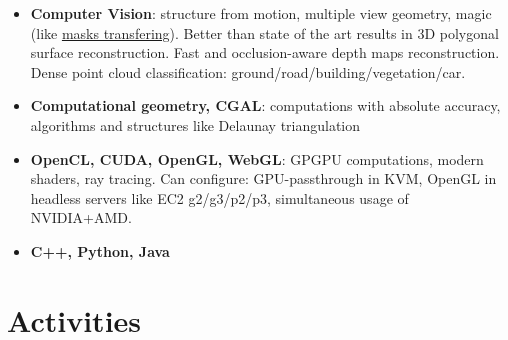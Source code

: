 \documentclass[11pt,oneside]{article}
\newcommand{\hhref}[2]{\href{#1}{\color{blue}#2}}
\begin{document}
\begin{itemize}
    \item{\textbf{Computer Vision}}: structure from motion, multiple view geometry, magic (like  \hhref{http://www.agisoft.com/index.php?id=49}{masks transfering}).
    Better than state of the art results in 3D polygonal surface reconstruction.
    Fast and occlusion-aware depth maps reconstruction.
    Dense point cloud classification: ground/road/building/vegetation/car.

    \item{\textbf{Computational geometry, CGAL}}: computations with absolute accuracy, algorithms and structures like Delaunay triangulation

    \item{\textbf{OpenCL, CUDA, OpenGL, WebGL}}: GPGPU computations, modern shaders, ray tracing. Can configure: GPU-passthrough in KVM, OpenGL in headless servers like EC2 g2/g3/p2/p3, simultaneous usage of NVIDIA+AMD.

    \item{\textbf{C++, Python, Java}}
\end{itemize}


\vspace{-9pt}
\section*{\textbf{Activities}}
\vspace{-9pt}
\end{document}
